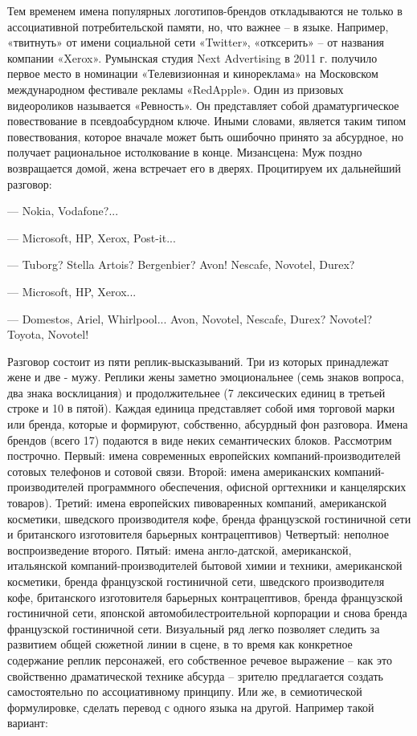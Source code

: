 Тем временем имена популярных логотипов-брендов откладываются не только в ассоциативной потребительской памяти, но, что важнее -- в языке.  Например,  «твитнуть» от имени социальной сети «Twitter», «отксерить» -- от названия компании «Xerox». Румынская студия Next Advertising в 2011 г. получило первое место в номинации «Телевизионная и кинореклама» на Московском международном фестивале рекламы «RedApple». Один из призовых видеороликов называется «Ревность». Он представляет собой драматургическое повествование в псевдоабсурдном ключе. Иными словами, является таким типом повествования, которое вначале может быть ошибочно принято за абсурдное, но получает рациональное истолкование в конце\autocite{ivleva_thesis}.
Мизансцена: Муж поздно возвращается домой, жена встречает его в дверях. Процитируем их дальнейший разговор:

— Nokia, Vodafone?...

— Microsoft, HP, Xerox, Post-it...

— Tuborg? Stella Artois? Bergenbier? Avon! Nescafe, Novotel, Durex?

— Microsoft, HP, Xerox...

— Domestos, Ariel, Whirlpool... Avon, Novotel, Nescafe, Durex? Novotel? Toyota, Novotel!

Разговор состоит из пяти реплик-высказываний. Три из которых принадлежат жене и две - мужу. Реплики жены заметно эмоциональнее (семь знаков вопроса, два знака восклицания) и продолжительнее (7 лексических единиц в третьей строке и 10 в пятой). Каждая единица представляет собой имя торговой марки или бренда, которые и формируют, собственно, абсурдный фон разговора. Имена брендов (всего 17) подаются в виде неких семантических блоков. Рассмотрим построчно.
Первый: имена современных европейских компаний-производителей сотовых телефонов и сотовой связи.
Второй: имена американских компаний-производителей программного обеспечения, офисной оргтехники и канцелярских товаров).
Третий: имена европейских пивоваренных компаний, американской косметики, шведского производителя кофе, бренда французской гостиничной сети и британского изготовителя барьерных контрацептивов)
Четвертый: неполное воспроизведение второго.
Пятый: имена англо-датской, американской, итальянской компаний-производителей бытовой химии и техники, американской косметики, бренда французской гостиничной сети, шведского производителя кофе, британского изготовителя барьерных контрацептивов, бренда французской гостиничной сети, японской автомобилестроительной корпорации и снова бренда французской гостиничной сети.
Визуальный ряд легко позволяет следить за развитием общей сюжетной линии в сцене, в то время как конкретное содержание реплик персонажей, его собственное речевое выражение – как это свойственно драматической технике абсурда – зрителю предлагается создать самостоятельно по ассоциативному принципу\autocites[][189-209]{stern1990}[][72-81]{stern1992}[][35-49]{arias2000}. Или же, в семиотической формулировке, сделать перевод с одного языка на другой. Например такой вариант:

